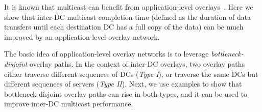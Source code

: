 It is known that multicast can
benefit from application-level overlays~\cite{chu2000case}.
Here we show that inter-DC multicast
completion time (defined as the duration of data transfers
until each destination DC has a full copy of the data)
can be much improved by an
application-level overlay network.

The basic idea of application-level overlay networks is
to leverage {\em bottleneck-disjoint} overlay paths.
In the context of inter-DC overlays, two
overlay paths either traverse different sequences of DCs ({\em Type I}), or
traverse the same DCs but different sequences of
servers ({\em Type II}).
Next, we use examples to show that bottleneck-disjoint overlay paths can rise in both types, and it can be used to improve inter-DC multicast performance.

